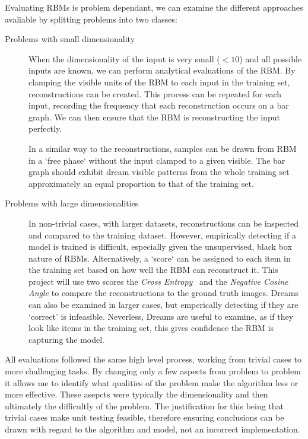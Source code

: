   Evaluating RBMs is problem dependant, we can examine the different approaches avaliable by splitting problems into two classes:
  \begin{description}
  \item[Problems with small dimensionality] When the dimensionality of the input is very small ($<10$) and all possible inputs are known, we can perform analytical evaluations of the RBM. By clamping the visible units of the RBM to each input in the training set, reconstructions can be created. This process can be repeated for each input, recording the frequency that each reconstruction occurs on a bar graph. We can then ensure that the RBM is reconstructing the input perfectly.

  In a similar way to the reconstructions, samples can be drawn from RBM in a `free phase` without the input clamped to a given visible. The bar graph should exhibit dream visible patterns from the whole training set approximately an equal proportion to that of the training set.

  \item[Problems with large dimensionalities] In non-trivial cases, with larger datasets, reconstructions can be inspected and compared to the training dataset. However, empirically detecting if a model is trained is difficult, especially given the unsupervised, black box nature of RBMs.
  Alternatively, a `score` can be assigned to each item in the training set based on how well the RBM can reconstruct it.
  This project will use two scores the \emph{Cross Entropy}~\cite{golik2013cross} and the \emph{Negative Cosine Angle} to compare the reconstructions to the ground truth images.
  Dreams can also be examined in larger cases, but emperically detecting if they are `correct' is infeasible. Neverless, Dreams are useful to examine, as if they look like items in the training set, this gives confidence the RBM is capturing the model.

\end{description}

All evaluations followed the same high level process, working from trivial cases to more challenging tasks. By changing only a few aspects from problem to problem it allows me to identify what qualities of the problem make the algorithm less or more effective. These asepcts were typically the dimensionality and then ultimately the difficultly of the problem. The justification for this being that trivial cases make unit testing feasible, therefore ensuring conclusions can be drawn with regard to the algorithm and model, not an incorrect implementation.

